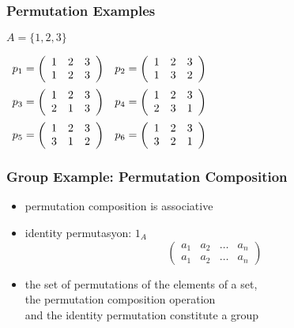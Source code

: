 \documentclass[dvipsnames]{beamer}
\begin{document}
\begin{frame}
  \frametitle{Permutation Examples}

  \begin{example}
    $A = \{1,2,3\}$

    \medskip
    $\begin{array}{cc}
      p_1 = \left(
        \begin{array}{ccc}
          1 & 2 & 3\\
          1 & 2 & 3
        \end{array}
      \right) &
      p_2 = \left(
        \begin{array}{ccc}
          1 & 2 & 3\\
          1 & 3 & 2
        \end{array}
      \right)\medskip\\
      p_3 = \left(
        \begin{array}{ccc}
          1 & 2 & 3\\
          2 & 1 & 3
        \end{array}
      \right) &
      p_4 = \left(
        \begin{array}{ccc}
          1 & 2 & 3\\
          2 & 3 & 1
        \end{array}
      \right)\medskip\\
      p_5 = \left(
        \begin{array}{ccc}
          1 & 2 & 3\\
          3 & 1 & 2
        \end{array}
      \right) &
      p_6 = \left(
        \begin{array}{ccc}
          1 & 2 & 3\\
          3 & 2 & 1
        \end{array}
      \right)
    \end{array}$
  \end{example}
\end{frame}

\begin{frame}
  \frametitle{Group Example: Permutation Composition}

  \begin{itemize}
    \item permutation composition is associative
    \item identity permutasyon: $1_A$
    \[\left(
      \begin{array}{cccc}
         a_1 & a_2 & \dots & a_n\\
         a_1 & a_2 & \dots & a_n
      \end{array}
    \right)\]

    \pause
    \medskip
    \item the set of permutations of the elements of a set,\\
      the permutation composition operation\\
      and the identity permutation constitute a group
  \end{itemize}
\end{frame}
\end{document}
